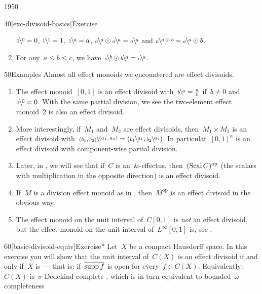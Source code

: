 \begin{parsec}{1950}
\begin{point}{40}[exc-divisoid-basics]{Exercise}
\begin{enumerate}
    $\rfrac{0}{0}=0$, $\rfrac{1}{1}=1$, $\rfrac{a}{1}=a$, $\rfrac{a}{a} \odot \rfrac{a}{a} = \rfrac{a}{a}$ and
    $\rfrac{a \odot b}{a} = \rfrac{a}{a }\odot b$.
\item
    For any~$a \leq b \leq c$,
    we have~$\rfrac{b}{c} \odot \rfrac{a}{b} = \rfrac{a}{c}$.
\end{enumerate}
\spacingfix{}
\end{point}
\begin{point}{50}{Examples}%
Almost all effect monoids we encountered
    are effect divisoids.
\begin{enumerate}
\item
The effect monoid~$[0,1]$
    is an effect divisoid with~$\rfrac{a}{b} = \frac{a}{b}$
        if~$b \neq 0$ and~$\rfrac{0}{0}=0$.
With the same partial division, we see the two-element effect monoid~$2$
    is also an effect divisoid.
\item
More interestingly,
    if~$M_1$ and~$M_2$
    are effect divisoids,
    then~$M_1 \times M_2$
    is an effect divisoid
    with~$\rfrac{(a_1,a_2)}{(b_1,b_2)} =
    (\rfrac{a_1}{b_1}, \rfrac{a_2}{b_2})$.
In particular~$[0,1]^n$ is an effect divisoid
    with component-wise partial division.
\item
Later, in ,
    we will see that if~$C$ is an~$\&$-effectus,
then~$(\operatorname{Scal} C)^{\mathrm{op}}$ (the scalars with multiplication in the
    opposite direction)
    is an effect divisoid.
\item
If~$M$ is a division effect monoid as in \cite[dfn.~6.3]{kentapartial},
then~$M^{\textrm{op}}$ is an effect divisoid in the obvious way.
\item
The effect monoid on the unit interval of~$C[0,1]$
    is \emph{not} an effect divisoid,
    but the effect monoid on the unit interval of~$L^\infty[0,1]$
    is, see .
\end{enumerate}
\spacingfix{}
\end{point}
\begin{point}{60}[basic-divisoid-equiv]{Exercise*}%
Let~$X$ be a compact Hausdorff space.
In this exercise you will show
    that the unit interval of~$C(X)$
    is an effect divisoid
    if and only if~$X$
    is 
    \cite[1H]{gillman2013rings}
    --- that is: if~$\overline{\operatorname{supp} f}$ is open
    for every~$f \in C(X)$.
Equivalently:
$C(X)$ is~$\sigma$-Dedekind complete
    \cite[3N.5]{gillman2013rings},
    which is in turn equivalent to bounded~$\omega$-completeness

\end{point}
\end{parsec}

